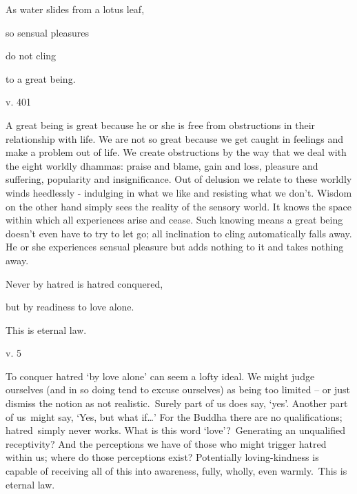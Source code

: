 \documentclass[a4paper,portrait,12pt]{article}
\begin{document}
As water slides from a lotus leaf,


so sensual pleasures


do not cling


to a great being.





v. 401





A great being is great because he or she is free from obstructions in their relationship with life. We are not so great because we get caught in feelings and make a problem out of life. We create obstructions by the way that we deal with the eight worldly dhammas: praise and blame, gain and loss, pleasure and suffering, popularity and insignificance. Out of delusion we relate to these worldly winds heedlessly - indulging in what we like and resisting what we don't. Wisdom on the other hand simply sees the reality of the sensory world. It knows the space within which all experiences arise and cease. Such knowing means a great being doesn't even have to try to let go; all inclination to cling automatically falls away. He or she experiences sensual pleasure but adds nothing to it and takes nothing away.














Never by hatred is hatred conquered,


but by readiness to love alone.


This is eternal law.





v. 5





To conquer hatred `by love alone' can seem a lofty ideal. We might judge ourselves (and in so doing tend to excuse ourselves) as being too limited -- or just dismiss the notion as not realistic. Surely part of us does say, `yes'. Another part of us might say, `Yes, but what if\ldots{}' For the Buddha there are no qualifications; hatred simply never works. What is this word `love'? Generating an unqualified receptivity? And the perceptions we have of those who might trigger hatred within us; where do those perceptions exist? Potentially loving-kindness is capable of receiving all of this into awareness, fully, wholly, even warmly. This is eternal law.
\end{document}
